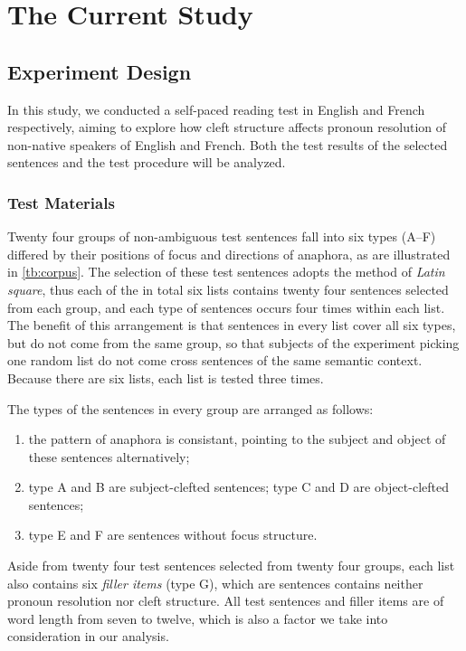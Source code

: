 \chapter{The Current Study}

\section{Experiment Design}
In this study, we conducted a self-paced reading test in English and French respectively, aiming to explore how cleft structure affects pronoun resolution of non-native speakers of English and French. Both the test results of the selected sentences and the test procedure will be analyzed.

\subsection{Test Materials}
Twenty four groups of  non-ambiguous test sentences fall into six types (A--F) differed by their positions of focus and directions of anaphora, as are illustrated in \autoref{tb:corpus}. The selection of these test sentences adopts the method of \emph{Latin square}, thus each of the in total six lists contains twenty four sentences selected from each group, and each type of sentences occurs four times within each list. The benefit of this arrangement is that sentences in every list cover all six types, but do not come from the same group, so that subjects of the experiment picking one random list do not come cross sentences of the same semantic context. Because there are six lists, each list is tested three times.

The types of the sentences in every group are arranged as follows: \begin{enumerate}
    \item the pattern of anaphora is consistant, pointing to the subject and object of these sentences alternatively;
    \item type A and B are subject-clefted sentences; type C and D are object-clefted sentences;
    \item type E and F are sentences without focus structure.
\end{enumerate}   
Aside from twenty four test sentences selected from twenty four groups, each list also contains six \emph{filler items} (type G), which are sentences contains neither pronoun resolution nor cleft structure. All test sentences and filler items are of word length from seven to twelve, which is also a factor we take into consideration in our analysis. 

